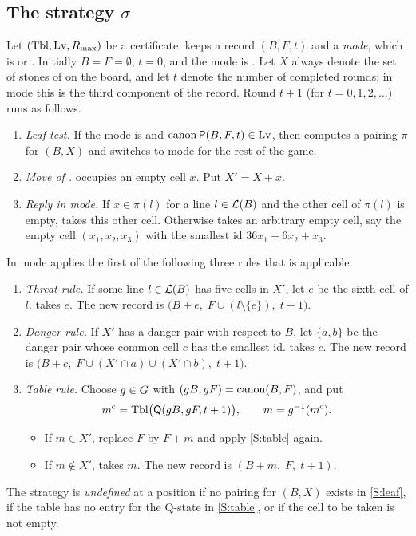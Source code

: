 \subsection{The strategy \texorpdfstring{$\sigma$}{sigma}}\label{sec:sigma}

\begin{definition}\label{def:sigma}
Let $(\mathrm{Tbl},\mathrm{Lv},R_{\max})$ be a certificate. \Breaker{} keeps a record $(B,F,t)$ and a \emph{mode}, which is
\TABLE{} or \PAIRING. Initially $B=F=\emptyset$, $t=0$, and the mode is \TABLE. Let $X$ always denote the set
of stones of \Maker{} on the board, and let $t$ denote the number of completed rounds; in \TABLE{} mode
this is the third component of the record. Round $t+1$ (for $t=0,1,2,\dots$) runs as follows.
\begin{enumerate}[label=\textup{(S\arabic*)},leftmargin=3em]
\item\label{S:leaf} \emph{Leaf test.} If the mode is \TABLE{} and $\operatorname{canon}\mathsf{P}(B,F,t)\in\mathrm{Lv}$, then
  \Breaker{} computes a pairing $\pi$ for $(B,X)$ and switches to \PAIRING{} mode for the rest of the game.
\item\label{S:maker} \emph{Move of \Maker.} \Maker{} occupies an empty cell $x$. Put $X'=X+x$.
\item\label{S:pairing} \emph{Reply in \PAIRING{} mode.} If $x\in\pi(l)$ for a line $l\in\mathcal{L}(B)$ and the
  other cell of $\pi(l)$ is empty, \Breaker{} takes this other cell. Otherwise \Breaker{} takes an
  arbitrary empty cell, say the empty cell $(x_1,x_2,x_3)$ with the smallest id $36x_1+6x_2+x_3$.
\end{enumerate}
In \TABLE{} mode \Breaker{} applies the first of the following three rules that is applicable.
\begin{enumerate}[label=\textup{(S\arabic*)},leftmargin=3em,start=4]
\item\label{S:threat} \emph{Threat rule.} If some line $l\in\mathcal{L}(B)$ has five cells in $X'$, let $e$ be the
  sixth cell of $l$. \Breaker{} takes $e$. The new record is
  $\bigl(B+e,\;F\cup(l\setminus\{e\}),\;t+1\bigr)$.
\item\label{S:danger} \emph{Danger rule.} If $X'$ has a danger pair with respect to $B$, let $\{a,b\}$ be the
  danger pair whose common cell $c$ has the smallest id. \Breaker{} takes $c$. The new record is
  $\bigl(B+c,\;F\cup(X'\cap a)\cup(X'\cap b),\;t+1\bigr)$.
\item\label{S:table} \emph{Table rule.} Choose $g\in G$ with $(gB,gF)=\operatorname{canon}(B,F)$, and put
  \[ m^{\mathrm c}=\mathrm{Tbl}\bigl(\mathsf{Q}(gB,gF,t+1)\bigr),\qquad m=g^{-1}(m^{\mathrm c}). \]
  \begin{itemize}[leftmargin=1.5em]
  \item If $m\in X'$, replace $F$ by $F+m$ and apply \ref{S:table} again.
  \item If $m\notin X'$, \Breaker{} takes $m$. The new record is $(B+m,\;F,\;t+1)$.
  \end{itemize}
\end{enumerate}
The strategy is \emph{undefined} at a position if no pairing for $(B,X)$ exists in \ref{S:leaf}, if the table
has no entry for the Q-state in \ref{S:table}, or if the cell to be taken is not empty.
\end{definition}

